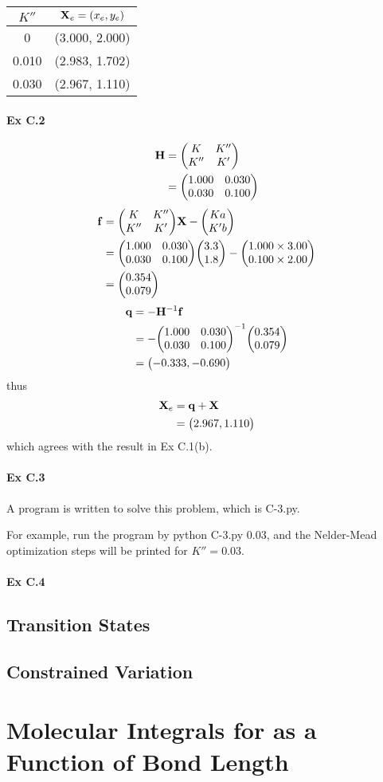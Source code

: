 \documentclass[a4paper]{article}
\newcommand{\ex}[1]{\paragraph{Ex #1}}
\numberwithin{equation}{subsection}
\newcommand{\code}[1]{\colorbox{codegray}{{\Consolas#1}}}
\begin{document}
\begin{table}
	\centering
	\begin{tabular}{cc}
		\hline
		$ K'' $ & $ \vb{X}_e = (x_e, y_e) $\\ \hline
		0 & (3.000, 2.000)\\
		0.010 & (2.983, 1.702)\\
		0.030 & (2.967, 1.110)\\ \hline
	\end{tabular}
\end{table}

\ex{C.2}
\begin{align}
\vb{H} 
&= \mqty(K & K'' \\ K'' & K') \notag\\
&= \mqty(1.000 & 0.030\\ 0.030 & 0.100)
\end{align}
\begin{align}
\vb{f} 
&= \mqty(K & K'' \\ K'' & K')\vb{X} - \mqty(K a \\ K' b) \notag\\
&= \mqty(1.000 & 0.030\\ 0.030 & 0.100)\mqty(3.3\\ 1.8) 
- \mqty(1.000\times 3.00\\ 0.100\times 2.00) \notag\\
&= \mqty(0.354\\ 0.079)
\end{align}
\begin{align}
\vb{q} &= -\vb{H}^{-1}\vb{f} \notag\\
&= -\mqty(1.000 & 0.030\\ 0.030 & 0.100)^{-1} \mqty(0.354\\ 0.079) \notag\\
&= \mqty(-0.333, -0.690)
\end{align}
thus
\begin{align}
\vb{X}_e &= \vb{q} + \vb{X} \notag\\
&= \mqty(2.967, 1.110)
\end{align}
which agrees with the result in Ex C.1(b).

\ex{C.3}
A program is written to solve this problem, which is \code{C-3.py}. 

For example, run the program by
\code{python C-3.py 0.03}, and the Nelder-Mead optimization steps will be printed for $ K'' = 0.03 $.

\ex{C.4}

\subsection{Transition States}

\subsection{Constrained Variation}

\section{Molecular Integrals for  as a Function of Bond Length}
\end{document}
